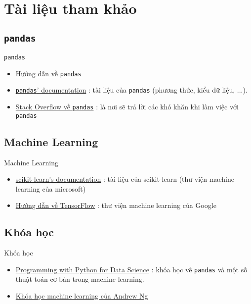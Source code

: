 \documentclass[11pt]{beamer}
\newcommand{\pandas}{\texttt{pandas}}
\begin{document}
\section{Tài liệu tham khảo}
\subsection{\pandas}
\begin{frame}{\pandas}
\begin{itemize}
\item \href{https://www.tutorialspoint.com/python_pandas/index.htm}{Hướng dẫn về \pandas}
\item \href{https://pandas.pydata.org/pandas-docs/stable/}{\pandas ' documentation} : tài liệu của \pandas{} (phương thức, kiểu dữ liệu, ...).
\item \href{https://stackoverflow.com/questions/tagged/pandas}{Stack Overflow về \pandas{}} : là nơi sẽ trả lời các khó khăn khi làm việc với \pandas
\end{itemize}
\end{frame}
\subsection{Machine Learning}
\begin{frame}{Machine Learning}
\begin{itemize}
\item \href{https://scikit-learn.org/stable/documentation.html}{scikit-learn's documentation} : tài liệu của scikit-learn (thư viện machine learning của microsoft)
\item \href{https://www.tensorflow.org/tutorials/}{Hướng dẫn về TensorFlow} : thư viện machine learning của Google
\end{itemize}
\end{frame}
\subsection{Khóa học}
\begin{frame}{Khóa học}
\begin{itemize}
\item \href{https://courses.edx.org/courses/course-v1:Microsoft+DAT210x+6T2016/course/}{Programming with Python for Data Science} : khóa học về \pandas{} và một số thuật toán cơ bản trong machine learning.
\item \href{https://www.coursera.org/learn/machine-learning}{Khóa học machine learning của Andrew Ng}
\end{itemize}
\end{frame}
\end{document}
